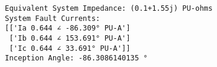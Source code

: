 \documentclass[11pt]{article}
\begin{document}
    \begin{Verbatim}[commandchars=\\\{\}]
Equivalent System Impedance: (0.1+1.55j) PU-ohms
System Fault Currents:
[['Ia 0.644 ∠ -86.309° PU-A']
 ['Ib 0.644 ∠ 153.691° PU-A']
 ['Ic 0.644 ∠ 33.691° PU-A']]
Inception Angle: -86.3086140135 °

    \end{Verbatim}


    
    
    
    
\end{document}
